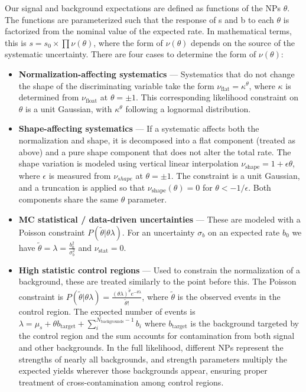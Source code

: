 Our signal and background expectations are defined as functions of the NPs $\theta$. The functions are parameterized such that the response of s and b to each $\theta$ is factorized from the nominal value of the expected rate. In mathematical terms, this is $s = s_{0} \times \prod \nu(\theta)$, where the form of $\nu(\theta)$ depends on the source of the systematic uncertainty. There are four cases to determine the form of $\nu(\theta)$:
\begin{itemize}
  \item \textbf{Normalization-affecting systematics} --- Systematics that do not change the shape of the discriminating variable take the form $\nu_{\mathrm{flat}} = \kappa^{\theta}$, where $\kappa$ is determined from $\nu_{\mathrm{float}}$ at $\theta = \pm{1}$. This corresponding likelihood constraint on $\theta$ is a unit Gaussian, with $\kappa^{\theta}$ following a lognormal distribution.
  \item \textbf{Shape-affecting systematics} --- If a systematic affects both the normalization and shape, it is decomposed into a flat component (treated as above) and a pure shape component that does not alter the total rate. The shape variation is modeled using vertical linear interpolation $\nu_{\mathrm{shape}} = 1 + \epsilon\theta$, where $\epsilon$ is measured from $\nu_{shape}$ at $\theta = \pm{1}$. The constraint is a unit Gaussian, and a truncation is applied so that $\nu_{\mathrm{shape}}(\theta) = 0$ for $\theta < -1/\epsilon$. Both components share the same $\theta$ parameter.
  \item \textbf{MC statistical / data-driven uncertainties} --- These are modeled with a Poisson constraint $P(\tilde{\theta}|\theta\lambda)$. For an uncertainty $\sigma_{b}$ on an expected rate $b_{0}$ we have $\tilde{\theta} = \lambda = \frac{b_{0}^{2}}{\sigma_{b}^{2}}$ and $\nu_{\mathrm{stat}} = 0$.
  \item \textbf{High statistic control regions} --- Used to constrain the normalization of a background, these are treated similarly to the point before this. The Poisson constraint is $P(\tilde{\theta}|\theta\lambda) = \frac{{(\theta\lambda)}^{\tilde{\theta}}e^{-\theta\lambda}}{\tilde{\theta}!}$, where $\tilde{\theta}$ is the observed events in the control region. The expected number of events is $\lambda = \mu_{s} + \theta b_{\mathrm{target}} + \sum_{i}^{N_{\mathrm{backgrounds}}-1}b_{i}$ where $b_{\mathrm{target}}$ is the background targeted by the control region and the sum accounts for contamination from both signal and other backgrounds. In the full likelihood, different NPs represent the strengths of nearly all backgrounds, and strength parameters multiply the expected yields wherever those backgrounds appear, ensuring proper treatment of cross-contamination among control regions.
\end{itemize}

